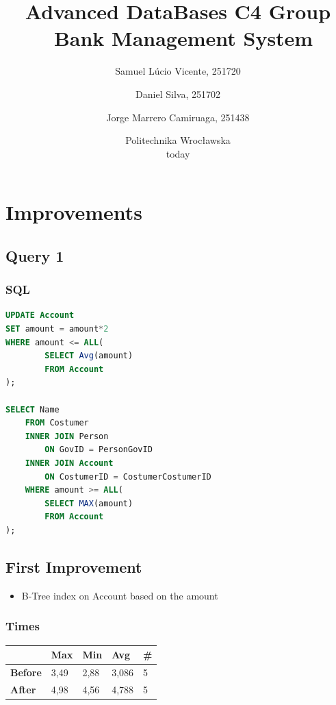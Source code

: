 \documentclass[a4paper, 10pt]{article}
\begin{document}
\title{Advanced DataBases C4 Group\\\
  \huge Bank Management System}
\author{
  Samuel Lúcio Vicente, 251720
  \and
  Daniel Silva, 251702
  \and
  Jorge Marrero Camiruaga, 251438
}

\date{Politechnika Wrocławska\\today}

\maketitle


\section{Improvements}

\subsection{Query 1}
\subsubsection{SQL}
\begin{lstlisting}[language=SQL]
UPDATE Account 
SET amount = amount*2 
WHERE amount <= ALL(
        SELECT Avg(amount) 
        FROM Account 
);

SELECT Name
    FROM Costumer
    INNER JOIN Person
        ON GovID = PersonGovID 
    INNER JOIN Account 
        ON CostumerID = CostumerCostumerID
    WHERE amount >= ALL(
        SELECT MAX(amount) 
        FROM Account 
);
\end{lstlisting}

\subsection{First Improvement}
\begin{itemize}
  \item B-Tree index on Account based on the amount
\end{itemize}
\subsubsection{Times}
\begin{table}[H]
\begin{tabular}{l|l|l|l|l|}
\cline{2-5}
\textbf{}                             & \textbf{Max} & \textbf{Min} & \textbf{Avg} & \textbf{\#}  \\ \hline
\multicolumn{1}{|l|}{\textbf{Before}} & 3,49          & 2,88          & 3,086          & 5            \\ \hline
\multicolumn{1}{|l|}{\textbf{After}}  & 4,98          & 4,56          & 4,788          & 5            \\ \hline
\end{tabular}
\end{table}
\end{document}
